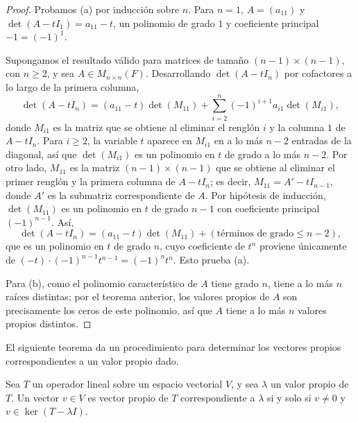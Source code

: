 \documentclass[12pt,a4paper]{book}
\begin{document}
    \begin{proof}
        Probamos (a) por inducción sobre $n$. Para $n=1$, $A = (a_{11})$ y $\det(A - tI_1) = a_{11} - t$, un polinomio de grado $1$ y coeficiente principal $-1 = (-1)^1$.

        Supongamos el resultado válido para matrices de tamaño $(n-1)\times(n-1)$, con $n \geq 2$, y sea $A \in M_{n\times n}(F)$. Desarrollando $\det(A - tI_n)$ por cofactores a lo largo de la primera columna,
        \begin{equation*}
            \det(A - tI_n) = (a_{11} - t)\det(M_{11}) + \sum_{i=2}^{n} (-1)^{i+1} a_{i1} \det(M_{i1}),
        \end{equation*}
        donde $M_{i1}$ es la matriz que se obtiene al eliminar el renglón $i$ y la columna $1$ de $A - tI_n$. Para $i \geq 2$, la variable $t$ aparece en $M_{i1}$ en a lo más $n-2$ entradas de la diagonal, así que $\det(M_{i1})$ es un polinomio en $t$ de grado a lo más $n-2$. Por otro lado, $M_{11}$ es la matriz $(n-1)\times(n-1)$ que se obtiene al eliminar el primer renglón y la primera columna de $A - tI_n$; es decir, $M_{11} = A' - tI_{n-1}$, donde $A'$ es la submatriz correspondiente de $A$. Por hipótesis de inducción, $\det(M_{11})$ es un polinomio en $t$ de grado $n-1$ con coeficiente principal $(-1)^{n-1}$. Así,
        \begin{equation*}
            \det(A - tI_n) = (a_{11}-t)\det(M_{11}) + (\text{términos de grado} \leq n-2),
        \end{equation*}
        que es un polinomio en $t$ de grado $n$, cuyo coeficiente de $t^n$ proviene únicamente de $(-t)\cdot(-1)^{n-1}t^{n-1} = (-1)^n t^n$. Esto prueba (a).

        Para (b), como el polinomio característico de $A$ tiene grado $n$, tiene a lo más $n$ raíces distintas; por el teorema anterior, los valores propios de $A$ son precisamente los ceros de este polinomio, así que $A$ tiene a lo más $n$ valores propios distintos.
    \end{proof}

    El siguiente teorema da un procedimiento para determinar los vectores propios correspondientes a un valor propio dado.

    \begin{teorema}
        Sea $T$ un operador lineal sobre un espacio vectorial $V$, y sea $\lambda$ un valor propio de $T$. Un vector $v \in V$ es vector propio de $T$ correspondiente a $\lambda$ si y solo si $v \neq 0$ y $v \in \ker(T - \lambda I)$.
    \end{teorema}
\end{document}

